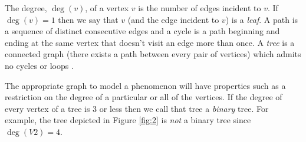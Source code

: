 \documentclass[10pt]{amsart} %
\theoremstyle{definition}
\newtheorem{ex}[thm]{Example}
\begin{document}
The degree, $\deg(v)$, of a vertex $v$ is the number of edges incident to $v$.  If $\deg(v) = 1$ then we say that $v$ (and the edge incident to $v$) is a  \emph{leaf}. A path is a sequence of distinct consecutive edges and a cycle is a path beginning and ending at the same vertex that doesn't visit an edge more than once.  A \emph{tree} is  a connected graph (there exists a path between every pair of vertices) which admits no cycles or loops \cite{bela}.  

The appropriate graph to model a phenomenon will have properties such as a restriction on the degree of a particular or all of the vertices.  If the degree of every vertex of a tree is 3 or less then we call that tree a \emph{binary} tree.  For example, the tree depicted in Figure \ref{fig:2} is \emph{not} a binary tree since $\deg(V2) = 4$.

\end{document}
